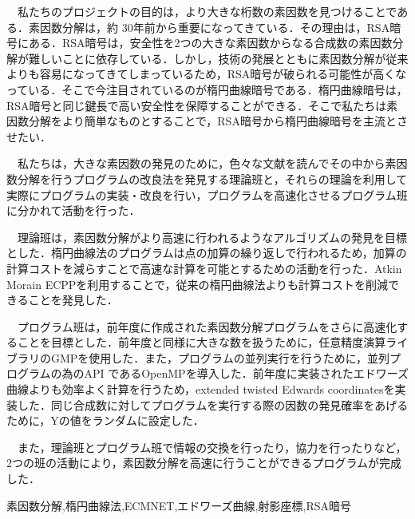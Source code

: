 \documentclass[openany,11pt,papersize]{jsbook}
\begin{document}
%
\maketitle

\frontmatter

\begin{jabstract}
　私たちのプロジェクトの目的は，より大きな桁数の素因数を見つけることである．素因数分解は，約 30年前から重要になってきている．その理由は，RSA暗号にある．RSA暗号は，安全性を2つの大きな素因数からなる合成数の素因数分解が難しいことに依存している．しかし，技術の発展とともに素因数分解が従来よりも容易になってきてしまっているため，RSA暗号が破られる可能性が高くなっている．そこで今注目されているのが楕円曲線暗号である．楕円曲線暗号は，RSA暗号と同じ鍵長で高い安全性を保障することができる．そこで私たちは素因数分解をより簡単なものとすることで，RSA暗号から楕円曲線暗号を主流とさせたい．

　私たちは，大きな素因数の発見のために，色々な文献を読んでその中から素因数分解を行うプログラムの改良法を発見する理論班と，それらの理論を利用して実際にプログラムの実装・改良を行い，プログラムを高速化させるプログラム班に分かれて活動を行った．

　理論班は，素因数分解がより高速に行われるようなアルゴリズムの発見を目標とした．楕円曲線法のプログラムは点の加算の繰り返しで行われるため，加算の計算コストを減らすことで高速な計算を可能とするための活動を行った．Atkin Morain ECPPを利用することで，従来の楕円曲線法よりも計算コストを削減できることを発見した．

　プログラム班は，前年度に作成された素因数分解プログラムをさらに高速化することを目標とした．前年度と同様に大きな数を扱うために，任意精度演算ライブラリのGMPを使用した．また，プログラムの並列実行を行うために，並列プログラムの為のAPI であるOpenMPを導入した．前年度に実装されたエドワーズ曲線よりも効率よく計算を行うため，extended twisted Edwards coordinatesを実装した．同じ合成数に対してプログラムを実行する際の因数の発見確率をあげるために，Yの値をランダムに設定した．

　また，理論班とプログラム班で情報の交換を行ったり，協力を行ったりなど，2つの班の活動により，素因数分解を高速に行うことができるプログラムが完成した．


\begin{jkeyword}
素因数分解,楕円曲線法,ECMNET,エドワーズ曲線,射影座標,RSA暗号
\end{jkeyword}
\end{jabstract}
\end{document}
